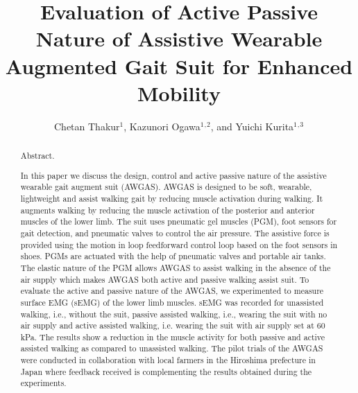 \documentclass[paper,JRM,paper]{jaciiiarticle}
\begin{document}
\pagestyle{jaciiistyle}

\title{Evaluation of Active Passive Nature of Assistive Wearable Augmented Gait Suit for Enhanced Mobility}

\author{Chetan Thakur$^1$, Kazunori Ogawa$^1$$^,$$^2$, and Yuichi Kurita$^1$$^,$$^3$}
\address{$^1$Hiroshima University, Hiroshima, Japan\\
		 $^2$ Daiya Industries Co, Ltd. Okayama, Japan\\
		 $^3$ JST PRESTO, Saitama, Japan\\
         E-mail: chetanthakur@hiroshima-u.ac.jp}
\maketitle

\begin{abstract}%
\noindent Abstract. %

In this paper we discuss the design, control and active passive nature of the assistive wearable gait augment suit (AWGAS).  AWGAS is designed to be soft, wearable, lightweight and assist walking gait by reducing muscle activation during walking. It augments walking by reducing the muscle activation of the posterior and anterior muscles of the lower limb. The suit uses pneumatic gel muscles (PGM), foot sensors for gait detection, and pneumatic valves to control the air pressure. The assistive force is provided using the motion in loop feedforward control loop based on the foot sensors in shoes. PGMs are actuated with the help of pneumatic valves and portable air tanks. The elastic nature of the PGM allows AWGAS to assist walking in the absence of the air supply which makes AWGAS both active and passive walking assist suit. To evaluate the active and passive nature of the AWGAS, we experimented to measure surface EMG (sEMG) of the lower limb muscles. sEMG was recorded for unassisted walking, i.e., without the suit, passive assisted walking, i.e., wearing the suit with no air supply and active assisted walking, i.e. wearing the suit with air supply set at 60 kPa.  The results show a reduction in the muscle activity for both passive and active assisted walking as compared to unassisted walking. The pilot trials of the AWGAS were conducted in collaboration with local farmers in the Hiroshima prefecture in Japan where feedback received is complementing the results obtained during the experiments.

\end{abstract}
\end{document}
